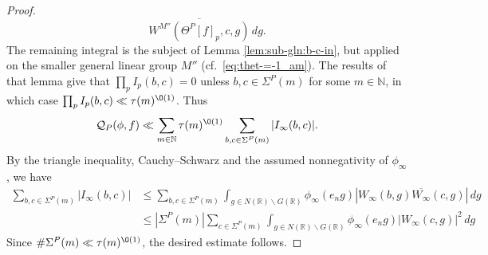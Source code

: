 \begin{proof}
\begin{equation*}
    \overline{W^{M''}(\Theta^P[f]_p, c, g)}
    \, d g.
  \end{equation*}
  The remaining integral is the subject of Lemma \ref{lem:sub-gln:b-c-in}, but applied on the smaller general linear group $M''$ (cf.\ \eqref{eq:thet-=-1_am}).  The results of that lemma give that $\prod_p I_p(b,c) = 0$ unless $b,c \in \Sigma^P(m)$ for some $m \in \mathbb{N}$, in which case $\prod_p I_p(b,c) \ll \tau(m)^{\O(1)}$.  Thus
  \begin{equation*}
    \mathcal{Q}_P(\phi,f)
    \ll
    \sum_{m \in \mathbb{N} }
    \tau(m)^{\O(1)}
    \sum_{b,c \in \Sigma^P(m)} |I_\infty(b,c)|.
  \end{equation*}
  By the triangle inequality, Cauchy--Schwarz and the assumed nonnegativity of $\phi_\infty$, we have
  \begin{align*}
    \sum_{b,c \in \Sigma^P(m)}
    |I_\infty(b,c)|
    &\leq
      \sum_{b, c \in \Sigma^P(m)}
      \int_{g \in N(\mathbb{R}) \backslash G(\mathbb{R})}
      \phi_\infty(e_n g)
      |W_\infty(b,g) \overline{W_\infty}(c,g)|
      \, d g
    \\
    &\leq
      |\Sigma^P(m)|
      \sum_{ c \in \Sigma^P(m)}
      \int_{g \in N(\mathbb{R}) \backslash G(\mathbb{R})}
      \phi_\infty(e_n g)
      |W_\infty(c,g)|^2
      \, d g
  \end{align*}
  Since $\# \Sigma^P(m) \ll \tau(m)^{\O(1)}$, the desired estimate follows.
\end{proof}


